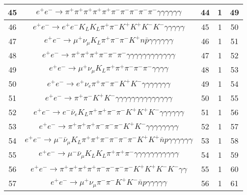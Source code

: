 \documentclass[landscape]{article}
\begin{document}
\begin{table}[htbp!]
\begin{tabular}{|c|c|c|c|c|}
\hline
45 & $ e^{+} e^{-} \rightarrow \pi^{+} \pi^{+} \pi^{+} \pi^{+} \pi^{+} \pi^{-} \pi^{-} \pi^{-} \pi^{-} \pi^{-} \gamma \gamma \gamma \gamma \gamma \gamma $ & 44 & 1 & 49 \\
\hline
46 & $ e^{+} e^{-} \rightarrow e^{+} e^{-} K_{L} K_{L} \pi^{+} \pi^{-} K^{+} K^{+} K^{-} K^{-} \gamma \gamma \gamma \gamma \gamma $ & 45 & 1 & 50 \\
\hline
47 & $ e^{+} e^{-} \rightarrow \mu^{+} \nu_{\mu} K_{L} \pi^{+} \pi^{-} \pi^{-} K^{+} n \bar{p} \gamma \gamma \gamma \gamma \gamma \gamma $ & 46 & 1 & 51 \\
\hline
48 & $ e^{+} e^{-} \rightarrow \pi^{+} \pi^{+} \pi^{+} \pi^{-} \pi^{-} \pi^{-} \gamma \gamma \gamma \gamma \gamma \gamma \gamma \gamma \gamma \gamma \gamma \gamma $ & 47 & 1 & 52 \\
\hline
49 & $ e^{+} e^{-} \rightarrow \mu^{+} \nu_{\mu} K_{L} \pi^{+} \pi^{+} \pi^{-} \pi^{-} \pi^{-} \gamma \gamma \gamma \gamma $ & 48 & 1 & 53 \\
\hline
50 & $ e^{+} e^{-} \rightarrow e^{+} \nu_{e} \pi^{+} \pi^{-} \pi^{-} K^{+} K^{-} \gamma \gamma \gamma \gamma \gamma \gamma \gamma $ & 49 & 1 & 54 \\
\hline
51 & $ e^{+} e^{-} \rightarrow \pi^{+} \pi^{-} K^{+} K^{-} \gamma \gamma \gamma \gamma \gamma \gamma \gamma \gamma \gamma \gamma \gamma \gamma \gamma \gamma $ & 50 & 1 & 55 \\
\hline
52 & $ e^{+} e^{-} \rightarrow e^{-} \bar{\nu}_{e} K_{L} \pi^{+} \pi^{+} \pi^{-} \pi^{-} K^{+} K^{+} K^{-} \gamma \gamma \gamma \gamma \gamma \gamma $ & 51 & 1 & 56 \\
\hline
53 & $ e^{+} e^{-} \rightarrow \pi^{+} \pi^{+} \pi^{+} \pi^{-} \pi^{-} \pi^{-} K^{+} K^{-} \gamma \gamma \gamma \gamma \gamma \gamma \gamma \gamma $ & 52 & 1 & 57 \\
\hline
54 & $ e^{+} e^{-} \rightarrow \mu^{-} \bar{\nu}_{\mu} K_{L} \pi^{+} \pi^{+} \pi^{-} \pi^{-} \pi^{-} \pi^{-} K^{+} K^{+} \bar{n} p \gamma \gamma \gamma \gamma \gamma \gamma $ & 53 & 1 & 58 \\
\hline
55 & $ e^{+} e^{-} \rightarrow \mu^{-} \bar{\nu}_{\mu} K_{L} K_{L} \pi^{+} \pi^{+} \pi^{-} \gamma \gamma \gamma \gamma \gamma \gamma \gamma \gamma \gamma \gamma \gamma $ & 54 & 1 & 59 \\
\hline
56 & $ e^{+} e^{-} \rightarrow \pi^{+} \pi^{+} \pi^{+} \pi^{+} \pi^{-} \pi^{-} \pi^{-} \pi^{-} K^{+} K^{+} K^{-} K^{-} \gamma \gamma $ & 55 & 1 & 60 \\
\hline
57 & $ e^{+} e^{-} \rightarrow \mu^{+} \nu_{\mu} \pi^{-} \pi^{-} K^{+} K^{-} \bar{n} p \gamma \gamma \gamma \gamma \gamma $ & 56 & 1 & 61 \\

\end{tabular}
\end{table}
\end{document}
